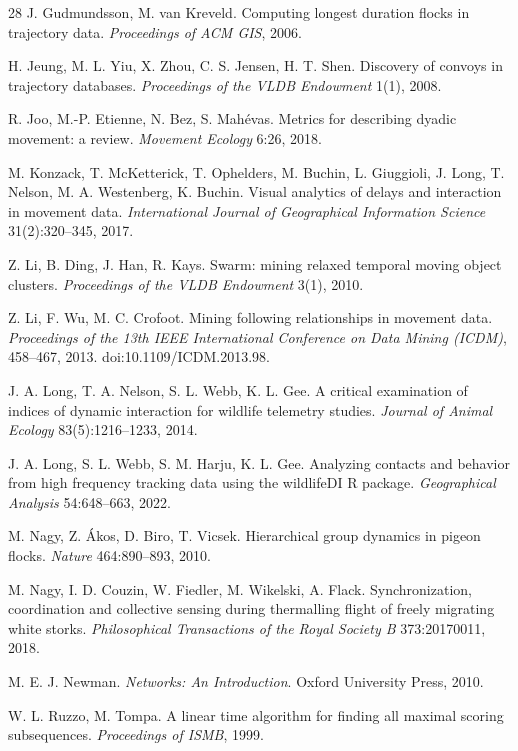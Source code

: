 \begin{thebibliography}{28}
 J. Gudmundsson, M. van Kreveld. Computing longest duration flocks in
trajectory data. \emph{Proceedings of ACM GIS}, 2006.

 H. Jeung, M. L. Yiu, X. Zhou, C. S. Jensen, H. T. Shen. Discovery of convoys in
trajectory databases. \emph{Proceedings of the VLDB Endowment} 1(1), 2008.

 R. Joo, M.-P. Etienne, N. Bez, S. Mahévas. Metrics for describing dyadic movement:
a review. \emph{Movement Ecology} 6:26, 2018.

 M. Konzack, T. McKetterick, T. Ophelders, M. Buchin, L. Giuggioli, J. Long,
T. Nelson, M. A. Westenberg, K. Buchin. Visual analytics of delays and interaction in movement
data. \emph{International Journal of Geographical Information Science} 31(2):320--345, 2017.

 Z. Li, B. Ding, J. Han, R. Kays. Swarm: mining relaxed temporal moving object
clusters. \emph{Proceedings of the VLDB Endowment} 3(1), 2010.

 Z. Li, F. Wu, M. C. Crofoot. Mining following relationships in movement data.
\emph{Proceedings of the 13th IEEE International Conference on Data Mining (ICDM)}, 458--467, 2013.
doi:10.1109/ICDM.2013.98.

 J. A. Long, T. A. Nelson, S. L. Webb, K. L. Gee. A critical examination of indices
of dynamic interaction for wildlife telemetry studies. \emph{Journal of Animal Ecology}
83(5):1216--1233, 2014.

 J. A. Long, S. L. Webb, S. M. Harju, K. L. Gee. Analyzing contacts and behavior
from high frequency tracking data using the wildlifeDI R package. \emph{Geographical Analysis}
54:648--663, 2022.

 M. Nagy, Z. Ákos, D. Biro, T. Vicsek. Hierarchical group dynamics in pigeon
flocks. \emph{Nature} 464:890--893, 2010.

 M. Nagy, I. D. Couzin, W. Fiedler, M. Wikelski, A. Flack. Synchronization,
coordination and collective sensing during thermalling flight of freely migrating white storks.
\emph{Philosophical Transactions of the Royal Society B} 373:20170011, 2018.

 M. E. J. Newman. \emph{Networks: An Introduction}. Oxford University Press,
2010.

 W. L. Ruzzo, M. Tompa. A linear time algorithm for finding all maximal scoring
subsequences. \emph{Proceedings of ISMB}, 1999.


\end{thebibliography}
